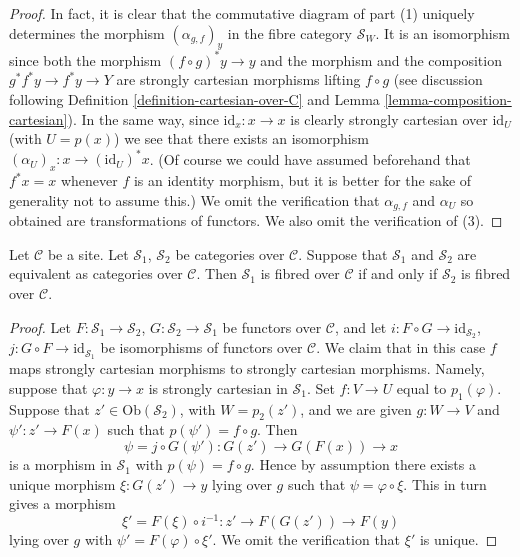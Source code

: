 \begin{proof}
In fact, it is clear that the commutative diagram of
part (1) uniquely determines the morphism
$(\alpha_{g, f})_y$ in the fibre category
$\mathcal{S}_W$. It is an isomorphism since both
the morphism $(f \circ g)^*y \to y$ and the morphism
and the composition $g^*f^*y \to f^*y \to Y$ are strongly
cartesian morphisms lifting $f \circ g$ (see discussion
following Definition \ref{definition-cartesian-over-C} and
Lemma \ref{lemma-composition-cartesian}). In the same way,
since $\text{id}_x : x \to x$ is clearly strongly cartesian
over $\text{id}_U$ (with $U = p(x)$) we see that there exists
an isomorphism $(\alpha_U)_x : x \to (\text{id}_U)^*x$.
(Of course we could have assumed beforehand that $f^*x = x$
whenever $f$ is an identity morphism, but it is better for
the sake of generality not to assume this.)
We omit the verification that $\alpha_{g, f}$ and
$\alpha_U$ so obtained are transformations of functors.
We also omit the verification of (3).
\end{proof}

\begin{lemma}
\label{lemma-fibred-equivalent}
Let $\mathcal{C}$ be a site.
Let $\mathcal{S}_1$, $\mathcal{S}_2$ be categories over $\mathcal{C}$.
Suppose that $\mathcal{S}_1$ and $\mathcal{S}_2$ are equivalent
as categories over $\mathcal{C}$.
Then $\mathcal{S}_1$ is fibred over $\mathcal{C}$ if and only if
$\mathcal{S}_2$ is fibred over $\mathcal{C}$.
\end{lemma}

\begin{proof}
Let $F : \mathcal{S}_1 \to \mathcal{S}_2$,
$G : \mathcal{S}_2 \to \mathcal{S}_1$ be functors over $\mathcal{C}$, and let
$i : F \circ G \to \text{id}_{\mathcal{S}_2}$,
$j : G \circ F \to \text{id}_{\mathcal{S}_1}$ be isomorphisms of
functors over $\mathcal{C}$.
We claim that in this case $f$ maps strongly cartesian morphisms
to strongly cartesian morphisms. Namely, suppose that
$\varphi : y \to x$ is strongly cartesian in $\mathcal{S}_1$.
Set $f : V \to U$ equal to $p_1(\varphi)$. Suppose that
$z' \in \text{Ob}(\mathcal{S}_2)$, with $W = p_2(z')$, and we are given
$g : W \to V$ and $\psi' : z' \to F(x)$ such that
$p(\psi') = f \circ g$. Then
$$
\psi = j \circ G(\psi') : G(z') \to G(F(x)) \to x
$$
is a morphism in $\mathcal{S}_1$ with $p(\psi) = f \circ g$.
Hence by assumption there exists a unique morphism $\xi : G(z') \to y$
lying over $g$ such that $\psi = \varphi \circ \xi$. This in turn gives a
morphism
$$
\xi' = F(\xi) \circ i^{-1} : z' \to F(G(z')) \to F(y)
$$
lying over $g$ with $\psi' = F(\varphi) \circ \xi'$. We omit the verification
that $\xi'$ is unique.
\end{proof}

